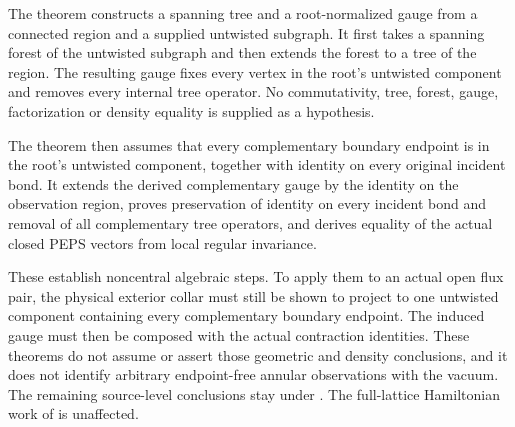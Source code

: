 \documentclass{article}
\begin{document}
The theorem
constructs a spanning tree and a root-normalized gauge from a connected
region and a supplied untwisted subgraph. It first takes a spanning forest
of the untwisted subgraph and then extends the forest to a tree of the
region. The resulting gauge fixes every vertex in the root's untwisted
component and removes every internal tree operator. No commutativity,
tree, forest, gauge, factorization or density equality is supplied as a
hypothesis.

The theorem
then assumes that every complementary boundary endpoint is in the root's
untwisted component, together with identity on every original incident
bond. It extends the derived complementary gauge by the identity on the
observation region, proves preservation of identity on every incident
bond and removal of all complementary tree operators, and derives equality
of the actual closed PEPS vectors from local regular invariance.

These establish noncentral algebraic steps. To apply them to an actual open
flux pair, the physical exterior collar must still be shown to project to
one untwisted component containing every complementary boundary endpoint.
The induced gauge must then be composed with the actual contraction
identities. These theorems do not assume or
assert those geometric and density conclusions, and it does not identify
arbitrary endpoint-free annular observations with the vacuum. The remaining
source-level conclusions stay under . The full-lattice
Hamiltonian work of  is unaffected.


\end{document}
